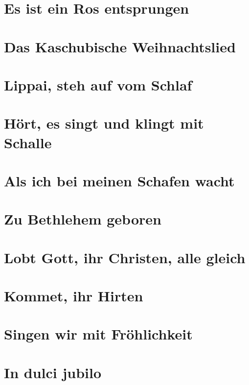 \documentclass[11pt]{article}
\begin{document}
\section{Es ist ein Ros entsprungen}

\section{Das Kaschubische Weihnachtslied}

\section{Lippai, steh auf vom Schlaf}

\section{Hört, es singt und klingt mit Schalle}

\section{Als ich bei meinen Schafen wacht}

\section{Zu Bethlehem geboren}

\section{Lobt Gott, ihr Christen, alle gleich}

\section{Kommet, ihr Hirten}

\section{Singen wir mit Fröhlichkeit}

\section{In dulci jubilo}
\end{document}
